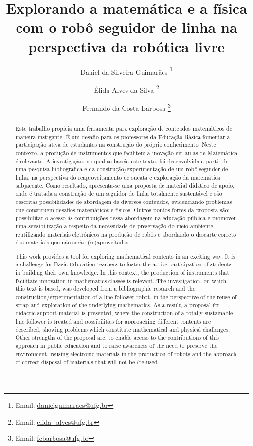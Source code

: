 \documentclass{textolivre}
\title{Explorando a matemática e a física com o robô seguidor de linha na perspectiva da robótica livre}
\author[1]{Daniel da Silveira Guimarães \orcid{0000-0003-1973-9609} \thanks{Email: \url{danielguimaraes@ufg.br}}}
\author[2]{Élida Alves da Silva \orcid{0000-0001-5417-9083} \thanks{Email: \url{elida_alves@ufg.br}}}
\author[1]{Fernando da Costa Barbosa \orcid{0000-0001-8558-3521} \thanks{Email: \url{fcbarbosa@ufg.br}}}
\affil[1]{Universidade Federal de Catalão, Catalão, GO, Brasil.}
\affil[2]{Universidade Federal de Goiás, Goiânia, GO, Brasil}
\begin{document}
\maketitle

\begin{polyabstract}
\begin{abstract}
Este trabalho propicia uma ferramenta para exploração de conteúdos matemáticos 
de maneira instigante. É um desafio para os professores da Educação Básica
fomentar a participação ativa de estudantes na construção do próprio
conhecimento. Neste contexto, a produção de instrumentos que facilitem a
inovação em aulas de Matemática é relevante. A investigação, na qual se baseia
este texto, foi desenvolvida a partir de uma pesquisa bibliográfica e da
construção/experimentação de um robô seguidor de linha, na perspectiva do
reaproveitamento de sucata e exploração da matemática subjacente. Como
resultado, apresenta-se uma proposta de material didático de apoio, onde é
tratada a construção de um seguidor de linha totalmente sustentável e são
descritas possibilidades de abordagem de diversos conteúdos, evidenciando
problemas que constituem desafios matemáticos e físicos. Outros pontos fortes
da proposta são: possibilitar o acesso às contribuições dessa abordagem na
educação pública e promover uma sensibilização a respeito da necessidade de
preservação do meio ambiente, reutilizando materiais eletrônicos na produção de
robôs e abordando o descarte correto dos materiais que não serão
(re)aproveitados.

\end{abstract}

\begin{english}
\begin{abstract}
This work provides a tool for exploring mathematical contents in an exciting
way. It is a challenge for Basic Education teachers to foster the active
participation of students in building their own knowledge. In this context, the
production of instruments that facilitate innovation in mathematics classes is
relevant. The investigation, on which this text is based, was developed from a
bibliographic research and the construction/experimentation of a line follower
robot, in the perspective of the reuse of scrap and exploration of the
underlying mathematics. As a result, a proposal for didactic support material
is presented, where the construction of a totally sustainable line follower is
treated and possibilities for approaching different contents are described,
showing problems which constitute mathematical and physical challenges. Other
strengths of the proposal are: to enable access to the contributions of this
approach in public education and to raise awareness of the need to preserve the
environment, reusing electronic materials in the production of robots and the
approach of correct disposal of materials that will not be (re)used.


\end{abstract}
\end{english}
\end{polyabstract}
\end{document}
